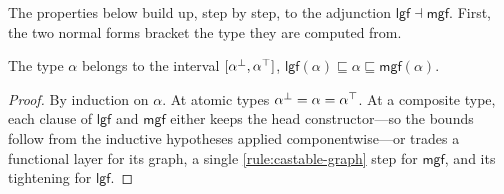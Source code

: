 The properties below build up, step by step, to the adjunction $\mathsf{lgf} \dashv \mathsf{mgf}$. First, the two normal forms bracket the type they are computed from.
\begin{theorem}
  The type \(\alpha\) belongs to the interval \([{\alpha}^{\bot}, {\alpha}^{\top}]\), \ie
  \(\mathsf{lgf}(\alpha) \sqsubseteq \alpha \sqsubseteq \mathsf{mgf}(\alpha).\)
  \begin{center}
  \end{center}
\end{theorem}
\begin{proof}
By induction on $\alpha$. At atomic types ${\alpha}^{\bot} = \alpha = {\alpha}^{\top}$. At a composite type, each clause of $\mathsf{lgf}$ and $\mathsf{mgf}$ either keeps the head constructor---so the bounds follow from the inductive hypotheses applied componentwise---or trades a functional layer for its graph, a single \ref{rule:castable-graph} step for $\mathsf{mgf}$, and its tightening for $\mathsf{lgf}$.
\end{proof}

